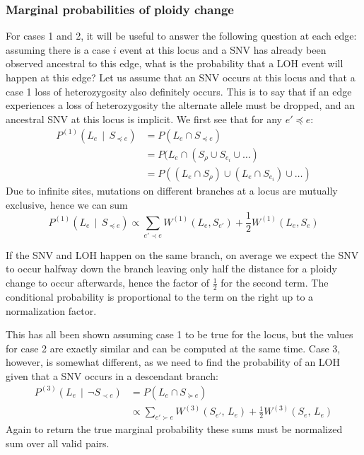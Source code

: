 \documentclass[../../main.tex]{subfiles}
\begin{document}
\subsubsection*{Marginal probabilities of ploidy change}

For cases 1 and 2, it will be useful to answer the following question at each edge: assuming there is a case $i$ event at this locus and a SNV has already been observed ancestral to this edge, what is the probability that a LOH event will happen at this edge?
Let us assume that an SNV occurs at this locus and that a case 1 loss of heterozygosity also definitely occurs.
This is to say that if an edge experiences a loss of heterozygosity the alternate allele must be dropped, and an ancestral SNV at this locus is implicit. 
We first see that for any $e'\preceq e$: 
\begin{align*}
    P^{(1)}(L_e\,\mid\,S_{\preceq e}) &= P(L_e\cap S_{\preceq e})\\
    &= P(L_e\cap(S_\rho \cup S_{e_i} \cup \dots)\\
    &= P((L_e\cap S_\rho) \cup (L_e\cap S_{e_i}) \cup \dots)
\end{align*}
Due to infinite sites, mutations on different branches at a locus are mutually exclusive, hence we can sum
\begin{equation*}
    P^{(1)}(L_e\,\mid\,S_{\preceq e}) \propto \sum_{e'\prec e}W^{(1)}(L_e, S_{e'}) + \frac{1}{2} W^{(1)}(L_e, S_e)
\end{equation*}

If the SNV and LOH happen on the same branch, on average we expect the SNV to occur halfway down the branch leaving only half the distance for a ploidy change to occur afterwards, hence the factor of $\frac{1}{2}$ for the second term.
The conditional probability is proportional to the term on the right up to a normalization factor.

This has all been shown assuming case 1 to be true for the locus, but the values for case 2 are exactly similar and can be computed at the same time.
Case 3, however, is somewhat different, as we need to find the probability of an LOH given that a SNV occurs in a descendant branch:
\begin{align*}
    P^{(3)}(L_e\,\mid\,\neg S_{\prec e}) &= P(L_e\cap S_{\succeq e})\\
    &\propto \sum_{e'\succ e}W^{(3)}(S_{e'},\,L_e) + \frac{1}{2}W^{(3)}(S_e,\,L_e)
\end{align*}
Again to return the true marginal probability these sums must be normalized sum over all valid pairs.
\end{document}
